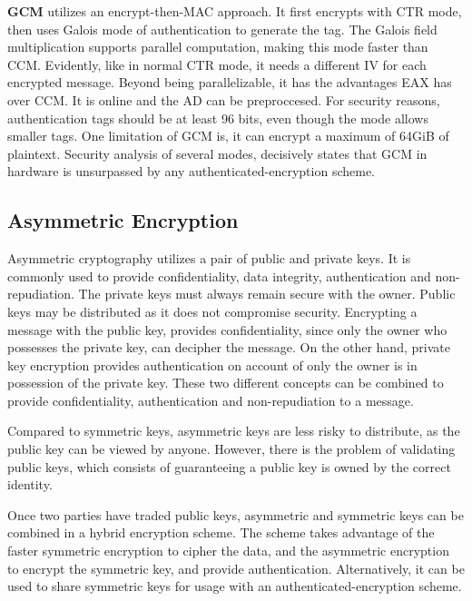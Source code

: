 \textbf{\ac{GCM}} utilizes an encrypt-then-MAC approach. It first encrypts with \ac{CTR} mode, then uses Galois mode of authentication to generate the tag. The Galois field multiplication supports parallel computation, making this mode faster than \ac{CCM}.
Evidently, like in normal \ac{CTR} mode, it needs a different \ac{IV} for each encrypted message.
Beyond being parallelizable, it has the advantages \ac{EAX} has over \ac{CCM}. It is online and the \ac{AD} can be preproccesed.
For security reasons, authentication tags should be at least 96 bits, even though the mode allows smaller tags. One limitation of \ac{GCM} is, it can encrypt a maximum of 64GiB of plaintext. Security analysis of several modes, decisively states that \ac{GCM} in hardware is unsurpassed by any authenticated-encryption scheme.


\subsection{Asymmetric Encryption}\label{chap:background:crypto:assymetric}

Asymmetric cryptography utilizes a pair of public and private keys. It is commonly used to provide confidentiality, data integrity, authentication and non-repudiation.
The private keys must always remain secure with the owner. Public keys may be distributed as it does not compromise security. Encrypting a message with the public key, provides confidentiality, since only the owner who possesses the private key, can decipher the message. On the other hand, private key encryption provides authentication on account of only the owner is in possession of the private key. These two different concepts can be combined to provide confidentiality, authentication and non-repudiation to a message.

Compared to symmetric keys, asymmetric keys are less risky to distribute, as the public key can be viewed by anyone. However, there is the problem of validating public keys, which consists of guaranteeing a public key is owned by the correct identity.

Once two parties have traded public keys, asymmetric and symmetric keys can be combined in a hybrid encryption scheme. The scheme takes advantage of the faster symmetric encryption to cipher the data, and the asymmetric encryption to encrypt the symmetric key, and provide authentication. Alternatively, it can be used to share symmetric keys for usage with an authenticated-encryption scheme.

